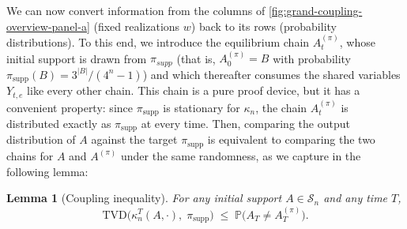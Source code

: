 \documentclass[
    aps,
    superscriptaddress,
    onecolumn,
    10pt,
    prx,
    nofootinbib
]{revtex4-2}
\newtheorem{lemma}{Lemma}
\theoremstyle{namedstatement}
\theoremstyle{plain}
\begin{document}
We can now convert information from the columns of \cref{fig:grand-coupling-overview-panel-a} (fixed realizations $w$) back to its rows (probability distributions). To this end, we introduce the equilibrium chain $A^{(\pi)}_t$, whose initial support is drawn from $\pi_{supp}$ (that is, $A^{(\pi)}_0 = B$ with probability $\pi_{\mathrm{supp}}(B) = 3^{|B|}/(4^n-1)$) and which thereafter consumes the shared variables $Y_{t,e}$ like every other chain. This chain is a pure proof device, but it has a convenient property: since $\pi_{\mathrm{supp}}$ is stationary for $\kappa_n$, the chain $A^{(\pi)}_t$ is distributed exactly as $\pi_{\mathrm{supp}}$ at every time. Then, comparing the output distribution of $A$ against the target $\pi_{\mathrm{supp}}$ is equivalent to comparing the two chains for $A$ and $A^{(\pi)}$ under the same randomness, as we capture in the following lemma:
\begin{lemma}[Coupling inequality]\label{lem:coupling_inequality}
For any initial support $A \in \mathcal{S}_n$ and any time $T$,
\begin{equation}\label{eq:coupling_inequality}
    \mathrm{TVD}\big( \kappa_n^{T}(A,\cdot),\; \pi_{\mathrm{supp}} \big)
    \;\le\;
    \mathbb{P}\big( A_T \neq A^{(\pi)}_T \big).
\end{equation}
\end{lemma}
\end{document}
